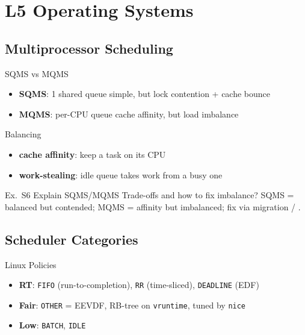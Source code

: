 \section{L5 Operating Systems}

\subsection{Multiprocessor Scheduling}


\begin{definition}{SQMS vs MQMS}
    \begin{itemize}
        \item \textbf{SQMS}: 1 shared queue simple, but lock contention + cache bounce
        \item \textbf{MQMS}: per-CPU queue cache affinity, but load imbalance
    \end{itemize}
\end{definition}

\begin{concept}{Balancing}
    \begin{itemize}
        \item \textbf{cache affinity}: keep a task on its CPU
        \item \textbf{work-stealing}: idle queue takes work from a busy one
    \end{itemize}
\end{concept}

\multend

\begin{example2}{Ex.\ S6 Explain SQMS/MQMS}
    Trade-offs and how to fix imbalance?
    \tcblower
    SQMS = balanced but contended; MQMS = affinity but imbalanced; fix via migration / .
\end{example2}

\subsection{Scheduler Categories}

\begin{definition}{Linux Policies}
    \begin{itemize}
        \item \textbf{RT}: \texttt{FIFO} (run-to-completion), \texttt{RR} (time-sliced), \texttt{DEADLINE} (EDF)
        \item \textbf{Fair}: \texttt{OTHER} = EEVDF, RB-tree on \texttt{vruntime}, tuned by \texttt{nice}
        \item \textbf{Low}: \texttt{BATCH}, \texttt{IDLE}
    \end{itemize}
\end{definition}


